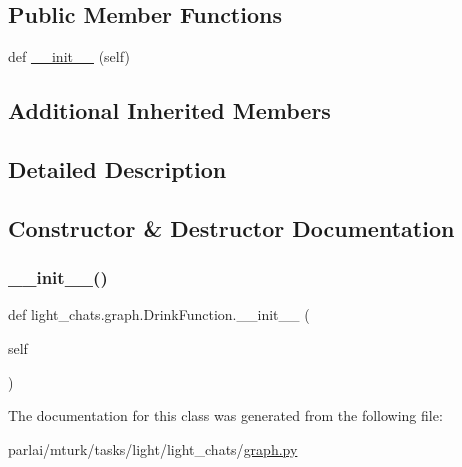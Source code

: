 \subsection*{Public Member Functions}
\begin{DoxyCompactItemize}
\item 
def \hyperlink{classlight__chats_1_1graph_1_1DrinkFunction_ab7c7036ff0885b5263458d0a75d5d878}{\+\_\+\+\_\+init\+\_\+\+\_\+} (self)
\end{DoxyCompactItemize}
\subsection*{Additional Inherited Members}


\subsection{Detailed Description}
\begin{DoxyVerb}
\end{DoxyVerb}
 

\subsection{Constructor \& Destructor Documentation}
\mbox{\label{classlight__chats_1_1graph_1_1DrinkFunction_ab7c7036ff0885b5263458d0a75d5d878}} 
\subsubsection{\texorpdfstring{\+\_\+\+\_\+init\+\_\+\+\_\+()}{\_\_init\_\_()}}
{\footnotesize\ttfamily def light\+\_\+chats.\+graph.\+Drink\+Function.\+\_\+\+\_\+init\+\_\+\+\_\+ (\begin{DoxyParamCaption}\item[{}]{self }\end{DoxyParamCaption})}



The documentation for this class was generated from the following file\+:\begin{DoxyCompactItemize}
\item 
parlai/mturk/tasks/light/light\+\_\+chats/\hyperlink{parlai_2mturk_2tasks_2light_2light__chats_2graph_8py}{graph.\+py}\end{DoxyCompactItemize}

